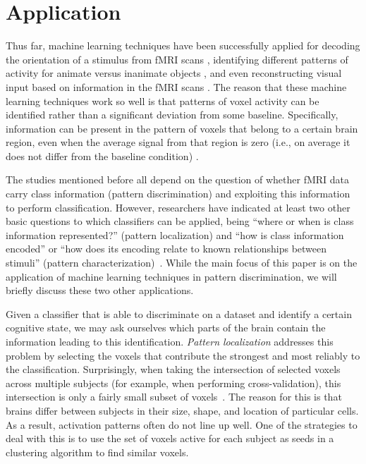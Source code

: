 \documentclass[preprint,journal,11pt]{vgtc}
\begin{document}


\section{Application}
\label{sec:application}
Thus far, machine learning techniques have been successfully applied for decoding the orientation of a stimulus from fMRI scans \cite{ka:2005decoding}, identifying different patterns of activity for animate versus inanimate objects \cite{kr:2008RSA}, and even reconstructing visual input based on information in the fMRI scans \cite{mi:2008re}. The reason that these machine learning techniques work so well is that patterns of voxel activity can be identified rather than a significant deviation from some baseline. Specifically, information can be present in the pattern of voxels that belong to a certain brain region, even when the average signal from that region is zero (i.e., on average it does not differ from the baseline condition) \cite{to:2012rev}.

The studies mentioned before all depend on the question of whether fMRI data carry class
information (pattern discrimination) and exploiting this information to perform classification. However, researchers have indicated at least two other basic questions to which classifiers can be applied, being ``where or when
is class information represented?'' (pattern localization) and ``how is
class information encoded'' or ``how does its encoding relate to known
relationships between stimuli'' (pattern characterization)~\cite{pereira2009machine}. While the main focus of this paper is on the application of machine learning techniques in pattern discrimination, we will briefly discuss these two other applications.

Given a classifier that is able to discriminate on a dataset and identify a certain cognitive state, we may ask ourselves which parts of the brain contain the information leading to this identification. \emph{Pattern localization} addresses this problem by selecting the voxels that contribute the strongest and most reliably to the classification. Surprisingly, when taking the intersection of selected voxels across multiple subjects (for example, when performing cross-validation), this intersection is only a fairly small subset of voxels~\cite{pereira2009machine}. The reason for this is that brains differ between subjects in their size, shape, and location of particular cells. As a result, activation patterns often do not line up well. One of the strategies to deal with this is to use the set of voxels active for each subject as seeds in a clustering algorithm to find similar voxels.\\
\end{document}
